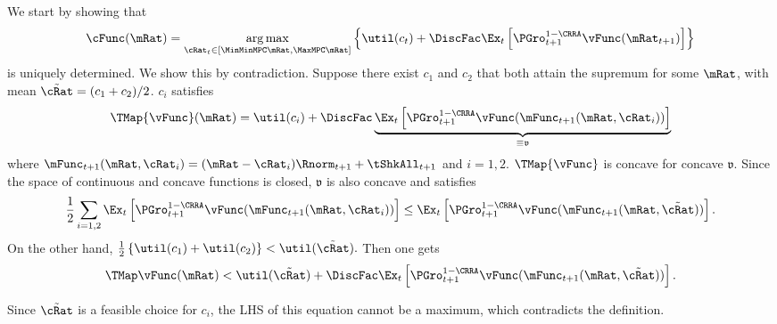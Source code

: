 \documentclass[titlepage]{\econtex}\providecommand{\texname}{BufferStockTheory}
\begin{document}
We start by showing that
\begin{equation}
\cFunc(\mRat)=\underset{\cRat_{t}\in [\MinMinMPC \mRat,\MaxMPC \mRat]}{\arg \max }\left\{
\util(c_{t})+\DiscFac \Ex_{t}\left[ {\PGro}_{t+1}^{1-\CRRA }\vFunc( {\mRat}_{t+1}) \right] \right\}
\end{equation}
is uniquely determined. We show this by contradiction. Suppose there
exist $c_{1}$ and $c_{2}$ that both attain the supremum for some $\mRat$,
with mean $\tilde{\cRat}=(c_{1}+c_{2})/2$. $c_{i}$ satisfies
\begin{equation}
\TMap{\vFunc}(\mRat)=\util(c_{i})+\DiscFac \underbrace{\Ex_{t}\left[ {\PGro}_{t+1}
^{1-\CRRA }\vFunc(\mFunc_{t+1}( \mRat,\cRat_{i}) )
\right]}_{\equiv \mathfrak{v}}
\end{equation}
where $\mFunc_{t+1}(\mRat,\cRat_{i}) =(\mRat-\cRat_{i})\Rnorm_{t+1}+\tShkAll_{t+1}$ and
$i=1,2$. $\TMap{\vFunc}$ is concave for concave $\mathfrak{v}$. Since the space of
continuous and concave functions is closed, $\mathfrak{v}$ is also
concave and satisfies
\begin{equation}
\frac{1}{2}\sum_{i=1,2}\Ex_{t}\left[ {\PGro}_{t+1}^{1-\CRRA
}\vFunc( \mFunc_{t+1}( \mRat,\cRat_{i}) ) \right] \leq
\Ex_{t}\left[ {\PGro}_{t+1}^{1-\CRRA }\vFunc( \mFunc_{t+1}( \mRat,\tilde{\cRat}) ) \right].
\end{equation}
On the other hand, $\frac{1}{2}\left\{ \util(c_{1})+\util(c_{2})\right\} <\util(
\tilde{\cRat}).$ Then one gets
\begin{equation}
\TMap \vFunc(\mRat)<\util(\tilde{\cRat})+\DiscFac \Ex_{t}\left[ {\PGro}_{t+1}^{1-\CRRA
}\vFunc( \mFunc_{t+1}( \mRat,\tilde{\cRat}) ) \right].
\end{equation}

Since $\tilde{\cRat}$ is a feasible choice for $c_{i}$, the
LHS of this equation cannot be a maximum,  which contradicts the definition.
\end{document}
